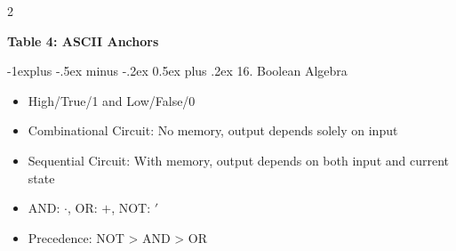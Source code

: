 \documentclass[10pt, portrait]{article}
\makeatletter
\renewcommand{\section}{\@startsection{section}{1}{0mm}%
                                {-1ex plus -.5ex minus -.2ex}%
                                {0.5ex plus .2ex}%
                                {\normalfont\large\bfseries}}
\renewcommand{\section}{\@startsection{section}{2}{0mm}%
                                {-1explus -.5ex minus -.2ex}%
                                {0.5ex plus .2ex}%
                                {\normalfont\normalsize\bfseries}}
\makeatother
\begin{document}
\begin{multicols*}{2}
\begin{center}
\textbf{Table 4: ASCII Anchors} \\[4pt]
\end{center}


\section{16. Boolean Algebra}
\begin{itemize}
    \item High/True/1 and Low/False/0
    \item Combinational Circuit: No memory, output depends solely on input
    \item Sequential Circuit: With memory, output depends on both input and current state
    \item AND: $\cdot$, OR: $+$, NOT: $'$
    \item Precedence: NOT > AND > OR
\end{itemize}


\end{multicols*}
\end{document}
